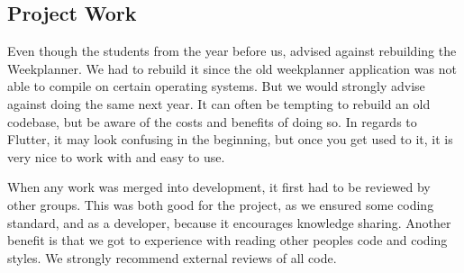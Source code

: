 \subsection{Project Work}

Even though the students from the year before us, advised against rebuilding the Weekplanner. We had to rebuild it since the old weekplanner application was not able to compile on certain operating systems. But we would strongly advise against doing the same next year. It can often be tempting to rebuild an old codebase, but be aware of the costs and benefits of doing so. In regards to Flutter, it may look confusing in the beginning, but once you get used to it, it is very nice to work with and easy to use.

When any work was merged into development, it first had to be reviewed by other groups. This was both good for the project, as we ensured some coding standard, and as a developer, because it encourages knowledge sharing. Another benefit is that we got to experience with reading other peoples code and coding styles. We strongly recommend external reviews of all code.